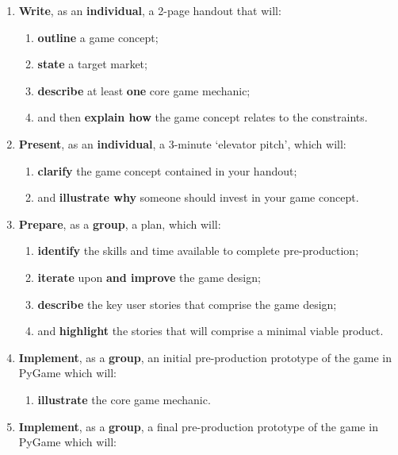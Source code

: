 \documentclass{../fal_assignment}
\begin{document}
\begin{enumerate}[label=(\Alph*)]
    \item \textbf{Write}, as an \textbf{individual}, a 2-page handout that will:
    	\begin{enumerate}[label=\roman*.]
    		\item \textbf{outline} a game concept;
    		\item \textbf{state} a target market;
    		\item \textbf{describe} at least \textbf{one} core game mechanic;
    		\item and then \textbf{explain how} the game concept relates to the constraints.
	\end{enumerate}
    \item \textbf{Present}, as an \textbf{individual}, a 3-minute `elevator pitch', which will:
    	\begin{enumerate}[label=\roman*.]
    		\item \textbf{clarify} the game concept contained in your handout;
    		\item and \textbf{illustrate why} someone should invest in your game concept.
	\end{enumerate}
    \item \textbf{Prepare}, as a \textbf{group}, a plan, which will:
    	\begin{enumerate}[label=\roman*.]
    	    	\item \textbf{identify} the skills and time available to complete pre-production;
    	    	\item \textbf{iterate} upon \textbf{and improve} the game design;
    		\item \textbf{describe} the key user stories that comprise the game design;
    		\item and \textbf{highlight} the stories that will comprise a minimal viable product.
	\end{enumerate}
    \item \textbf{Implement}, as a \textbf{group}, an initial pre-production prototype of the game in PyGame which will:
    	\begin{enumerate}[label=\roman*.]
    		\item \textbf{illustrate} the core game mechanic.
	\end{enumerate}
    \item \textbf{Implement}, as a \textbf{group}, a final pre-production prototype of the game in PyGame which will:
    	\begin{enumerate}[label=\roman*.]

\end{enumerate}
\end{enumerate}
\end{document}
